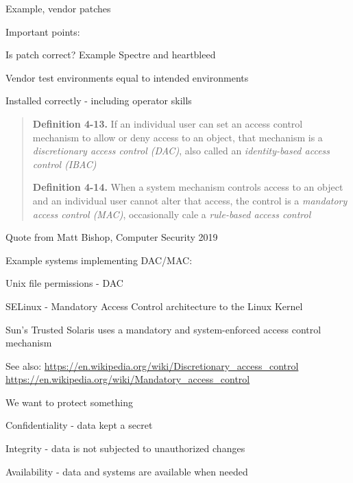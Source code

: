 \documentclass[Screen16to9,17pt]{foils}
\begin{document}
\begin{list1}
\item Example, vendor patches
\item Important points:
\begin{list2}
\item Is patch correct? Example Spectre and heartbleed
\item Vendor test environments equal to intended environments
\item Installed correctly - including operator skills
\end{list2}
\end{list1}


\begin{quote}
{\bf Definition 4-13.} If an individual user can set an access control mechanism to allow or deny access to an object, that mechanism is a \emph{discretionary access control (DAC)}, also called an \emph{identity-based access control (IBAC)}

{\bf Definition 4-14.}  When a system mechanism controls access to an object and an individual user cannot alter that access, the control is a \emph{mandatory access control (MAC)}, occasionally cale a \emph{rule-based access control}
\end{quote}

Quote from Matt Bishop, Computer Security 2019


Example systems implementing DAC/MAC:
\begin{list2}
\item Unix file permissions - DAC
\item SELinux - Mandatory Access Control architecture to the Linux Kernel
\item Sun's Trusted Solaris uses a mandatory and system-enforced access control mechanism
\end{list2}

See also:
\url{https://en.wikipedia.org/wiki/Discretionary_access_control}\\
\url{https://en.wikipedia.org/wiki/Mandatory_access_control}




\begin{list1}
\item We want to protect something
\item Confidentiality - data kept a secret
\item Integrity - data is not subjected to unauthorized changes
\item Availability - data and systems are available when needed
\end{list1}
\end{document}
